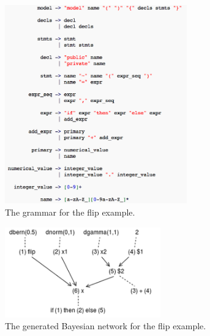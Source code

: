\begin{figure}
    \centering
    \includegraphics[width=0.7\textwidth]{figures/flip_syn.png}
    \caption{The grammar for the flip example.}
    \label{fig:flip_syn}
\end{figure}


\begin{figure}
    \centering
    \includegraphics[width=0.6\textwidth]{figures/flip_net.png}
    \caption{The generated Bayesian network for the flip example.}
    \label{fig:flip_net}
\end{figure}

